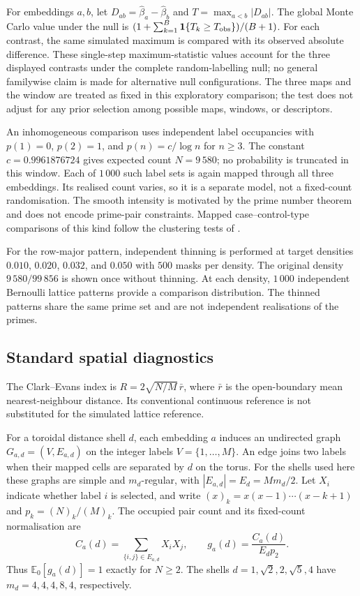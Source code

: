 \documentclass[final,1p,times,authoryear]{elsarticle}
\theoremstyle{definition}
\begin{document}
For embeddings $a,b$, let $D_{ab}=\hat\beta_a-\hat\beta_b$ and
$T=\max_{a<b}|D_{ab}|$. The global Monte Carlo value under the null is
$(1+\sum_{k=1}^{B}\mathbf{1}\{T_k\ge T_{\rm obs}\})/(B+1)$.
For each contrast, the same simulated maximum is compared with its observed
absolute difference. These single-step maximum-statistic values account for
the three displayed contrasts under the complete random-labelling null; no
general familywise claim is made for alternative null configurations. The
three maps and the window are treated as fixed in this exploratory comparison;
the test does not adjust for any prior selection among possible maps, windows,
or descriptors.

An inhomogeneous comparison uses independent label occupancies with
$p(1)=0$, $p(2)=1$, and $p(n)=c/\log n$ for $n\ge3$. The constant
$c=0.9961876724$ gives expected count $N=9\,580$; no probability is truncated
in this window. Each of $1\,000$ such label sets is again mapped through all
three embeddings. Its realised count varies, so it is a separate model, not a
fixed-count randomisation. The smooth intensity is motivated by the prime
number theorem and does not encode prime-pair constraints. Mapped
case--control-type comparisons of this kind follow the clustering tests of
\citet{CUZICK-EDWARDS-1990}.

For the row-major pattern, independent thinning is performed at target
densities $0.010$, $0.020$, $0.032$, and $0.050$ with $500$ masks per density.
The original density $9\,580/99\,856$ is shown once without thinning. At
each density, $1\,000$ independent Bernoulli lattice patterns provide a
comparison distribution. The thinned patterns share the same prime set and
are not independent realisations of the primes.

\subsection{Standard spatial diagnostics}

The Clark--Evans index is $R=2\sqrt{N/M}\,\bar r$, where $\bar r$ is the
open-boundary mean nearest-neighbour distance. Its conventional continuous
reference is not substituted for the simulated lattice reference.

For a toroidal distance shell $d$, each embedding $a$ induces an undirected
graph $G_{a,d}=(V,E_{a,d})$ on the integer labels $V=\{1,\ldots,M\}$.
An edge joins two labels when their mapped cells are separated by $d$ on the
torus. For the shells used here these graphs are simple and $m_d$-regular,
with $|E_{a,d}|=E_d=Mm_d/2$. Let $X_i$ indicate whether label $i$ is selected,
and write $(x)_k=x(x-1)\cdots(x-k+1)$ and $p_k=(N)_k/(M)_k$. The occupied
pair count and its fixed-count normalisation are
\begin{equation}
C_a(d)=\sum_{\{i,j\}\in E_{a,d}}X_iX_j,
\qquad
g_a(d)=\frac{C_a(d)}{E_d p_2}.
\label{eq:g2exact}
\end{equation}
Thus $\mathbb E_0[g_a(d)]=1$ exactly for $N\ge2$. The shells
$d=1,\sqrt2,2,\sqrt5,4$ have $m_d=4,4,4,8,4$, respectively.
\end{document}
